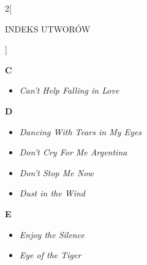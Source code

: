 \documentclass[a4paper]{report}
\begin{document}
\begin{multicols*}{2}[\begin{Huge}INDEKS UTWORÓW\end{Huge}\vspace{1cm}]
\begin{minipage}{\columnwidth}
\begin{Large}
		\textbf{C}
	\end{Large} 
	\begin{itemize}[topsep=6pt, after=\vspace{5mm}, leftmargin=0mm]
		\itemsep0em
		\item[]\textit{Can't Help Falling in Love}  \\
	\end{itemize}
\end{minipage}
\begin{minipage}{\columnwidth}
\begin{Large}
		\textbf{D}
	\end{Large} 
	\begin{itemize}[topsep=6pt, after=\vspace{1.5mm}, leftmargin=0mm]
		\itemsep0em
		\item[]\textit{Dancing With Tears in My Eyes}  \\
		\item[]  \textit{Don't Cry For Me Argentina}  \\
	\end{itemize}
\end{minipage}
\begin{minipage}{\columnwidth}
	\begin{itemize}[topsep=6pt, after=\vspace{5mm}, leftmargin=0mm]
		\itemsep0em
		\item[]  \textit{Don't Stop Me Now}  \\
		\item[]  \textit{Dust in the Wind}  \\
	\end{itemize}
\end{minipage}
\begin{minipage}{\columnwidth}
\begin{Large}
		\textbf{E}
	\end{Large} 
	\begin{itemize}[topsep=6pt, after=\vspace{5mm}, leftmargin=0mm]
		\itemsep0em
		\item[]\textit{Enjoy the Silence}  \\
		\item[]  \textit{Eye of the Tiger}  \\
	\end{itemize}
\end{minipage}

\end{multicols*}
\end{document}
